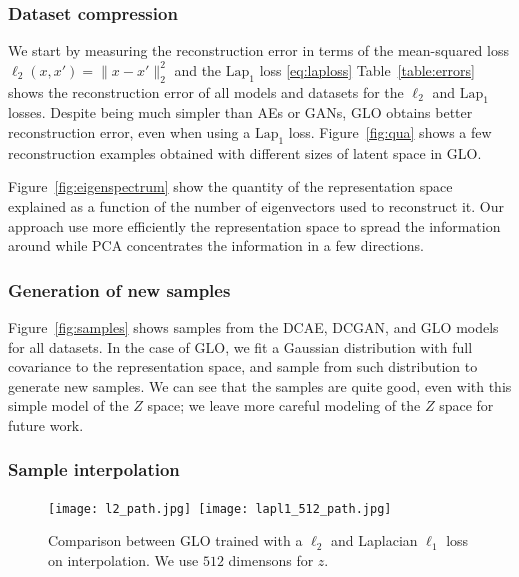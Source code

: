 \documentclass{article}
\newcommand{\GNAT}{GLO}
\begin{document}
\subsubsection{Dataset compression}\label{sec:experiments:compression}

We start by measuring the reconstruction error in terms of the mean-squared
loss $\ell_2(x,x') = \| x - x' \|_2^2$ and the $\text{Lap}_1$ loss
\eqref{eq:laploss}
Table~\ref{table:errors} shows the reconstruction error of all models and
datasets for the $\ell_2$ and $\text{Lap}_1$ losses.
Despite being much simpler than AEs or GANs, \GNAT{} obtains better reconstruction error, even when using a $\text{Lap}_1$ loss.
Figure~\ref{fig:qua} shows a few reconstruction examples obtained with different sizes of latent space in \GNAT{}.

Figure~\ref{fig:eigenspectrum} show the quantity of the representation space explained as a function of the number of eigenvectors
used to reconstruct it. Our approach use more efficiently the representation space to spread the information around while PCA
concentrates the information in a few directions.

\subsubsection{Generation of new samples}\label{sec:experiments:generation}

Figure~\ref{fig:samples} shows samples from the DCAE, DCGAN, and \GNAT{} models for all
datasets. In the case of \GNAT{}, we fit a Gaussian distribution with full
covariance to the representation space, and sample from such distribution to
generate new samples.  We can see that the samples are quite good, even with this simple model of the $Z$ space; we leave more careful modeling
of the $Z$ space for future work.
\subsubsection{Sample interpolation}\label{sec:experiments:interpolation}
\begin{figure}[t]
    \begin{center}
        \texttt{[image: l2\_path.jpg]}\        \texttt{[image: lapl1\_512\_path.jpg]}
    \end{center}
    \caption{Comparison between \GNAT{} trained with a $\ell_2$ and Laplacian $\ell_1$ loss on interpolation. We use $512$ dimensons for $z$.}
    \label{fig:comp22}
\end{figure}
\end{document}
